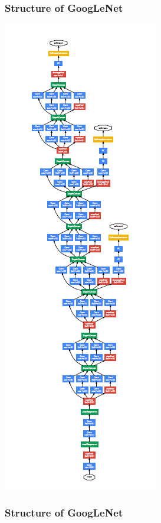 \begin{frame}[allowframebreaks]
	\frametitle{Structure of GoogLeNet}
	
	\begin{center}
		\includegraphics[scale=0.7]{figs/GoogLeNet_scheme}
	\end{center}
	
	\framebreak
	
	\frametitle{Structure of GoogLeNet}
	\begin{columns} %
		

\end{columns}
\end{frame}
